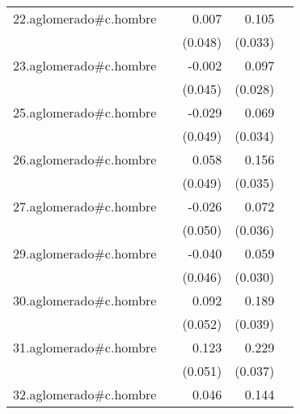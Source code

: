 {\begin{longtable}{l*{4}{D{.}{.}{-1}}}
\addlinespace
22.aglomerado#c.hombre&                     &       0.007         &       0.105\sym{**} &                     \\
            &                     &     (0.048)         &     (0.033)         &                     \\
\addlinespace
23.aglomerado#c.hombre&                     &      -0.002         &       0.097\sym{***}&                     \\
            &                     &     (0.045)         &     (0.028)         &                     \\
\addlinespace
25.aglomerado#c.hombre&                     &      -0.029         &       0.069\sym{*}  &                     \\
            &                     &     (0.049)         &     (0.034)         &                     \\
\addlinespace
26.aglomerado#c.hombre&                     &       0.058         &       0.156\sym{***}&                     \\
            &                     &     (0.049)         &     (0.035)         &                     \\
\addlinespace
27.aglomerado#c.hombre&                     &      -0.026         &       0.072\sym{*}  &                     \\
            &                     &     (0.050)         &     (0.036)         &                     \\
\addlinespace
29.aglomerado#c.hombre&                     &      -0.040         &       0.059         &                     \\
            &                     &     (0.046)         &     (0.030)         &                     \\
\addlinespace
30.aglomerado#c.hombre&                     &       0.092         &       0.189\sym{***}&                     \\
            &                     &     (0.052)         &     (0.039)         &                     \\
\addlinespace
31.aglomerado#c.hombre&                     &       0.123\sym{*}  &       0.229\sym{***}&                     \\
            &                     &     (0.051)         &     (0.037)         &                     \\
\addlinespace
32.aglomerado#c.hombre&                     &       0.046         &       0.144\sym{***}&                     \\

\end{longtable}}
